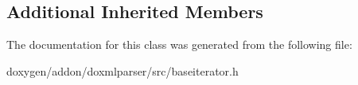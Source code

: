 \subsection*{Additional Inherited Members}


The documentation for this class was generated from the following file\+:\begin{DoxyCompactItemize}
\item 
doxygen/addon/doxmlparser/src/baseiterator.\+h\end{DoxyCompactItemize}
